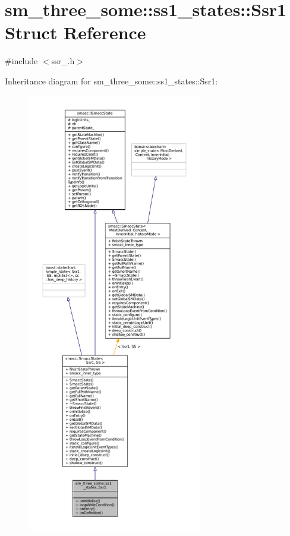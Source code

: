 \hypertarget{structsm__three__some_1_1ss1__states_1_1Ssr1}{}\section{sm\+\_\+three\+\_\+some\+:\+:ss1\+\_\+states\+:\+:Ssr1 Struct Reference}
\label{structsm__three__some_1_1ss1__states_1_1Ssr1}


{\ttfamily \#include $<$ssr\+\_.\+h$>$}



Inheritance diagram for sm\+\_\+three\+\_\+some\+:\+:ss1\+\_\+states\+:\+:Ssr1\+:
\nopagebreak
\begin{figure}[H]
\begin{center}
\leavevmode
\includegraphics[height=550pt]{structsm__three__some_1_1ss1__states_1_1Ssr1__inherit__graph}
\end{center}
\end{figure}


